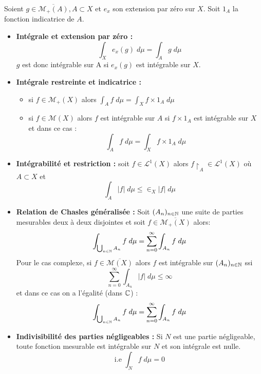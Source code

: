 \begin{prop}
    Soient $g \in \overline{\mathcal{M}_+(A)}, A \subset X$ et $e_x$ son extension par zéro sur $X$.
    Soit $1_A$ la fonction indicatrice de $A$.
    \begin{itemize}
        \item \textbf{Intégrale et extension par zéro :}
            \[ \int_{X} e_x(g) \; d \mu = \int_{A} g \; d \mu \] 
            $g$ est donc intégrable sur A si $e_x(g)$ est intégrable sur $X$.
        \item \textbf{Intégrale restreinte et indicatrice :}
            \begin{itemize}
                \item si $f \in \mathcal{M}_+(X)$ alors $\int_{A} f \; d \mu = \int_{X} f \times 1_A \; d \mu $ 
                \item si $f \in \mathcal{M}(X)$ alors $f$ est intégrable sur $A$ si $f \times 1_A$ est intégrable sur $X$ et dans ce cas :
                    \[ \boxed{ \int_{A} f \; d \mu = \int_{X} f \times 1_A \; d \mu } \] 
            \end{itemize}
        \item \textbf{Intégrabilité et restriction :} soit $f \in \mathcal{L}^1(X)$ alors $f\restriction_A \in \mathcal{L}^1(X)$ où $A \subset X$ et 
                \[ \int_A |f| \; d \mu \leq \in_X |f| \; d \mu \]
        \item \textbf{Relation de Chasles généralisée :} Soit $(A_n)_{n\in\mathbb{N}}$ une suite de parties 
            mesurables deux à deux disjointes et soit $f \in \overline{\mathcal{M}_+(X)}$ alors: 
                \[ \int_{\bigcup_{n \in \mathbb{N}} A_n} f \; d \mu = \sum_{n=0}^{\infty} \int_{A_n} f \; d \mu \]
            Pour le cas complexe, si $f \in \overline{\mathcal{M}(X)}$  alors $f$ est intégrable sur $(A_n)_{n\in\mathbb{N}}$ 
            ssi $$\sum_{n=0}^{\infty} \int_{A_n} |f| \; d \mu \le \infty $$
            et dans ce cas on a l'égalité (dans $\mathbb{C}$) :
                \[ \int_{\bigcup_{n \in \mathbb{N}} A_n} f \; d \mu = \sum_{n=0}^{\infty} \int_{A_n} f \; d \mu \]
        \item \textbf{Indivisibilité des parties négligeables :} Si $N$ est une partie négligeable, toute fonction mesurable est intégrable sur $N$ et son intégrale est nulle.
                \[ \text{i.e } \int_N f \; d \mu = 0 \]
    \end{itemize}
\end{prop}
\newpage

